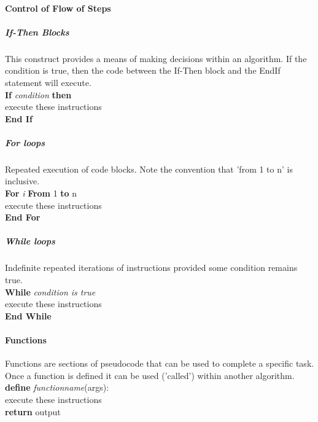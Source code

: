 \documentclass[a4paper,twoside,10pt]{article}
\newcommand{\codeindent}{\indent\hspace{2em}}
\begin{document}
			\paragraph{Control of Flow of Steps}
				\subparagraph{If-Then Blocks} This construct provides a means of making decisions within an algorithm. If the condition is true, then the code between the If-Then block and the EndIf statement will execute.\\
				\textbf{If} \textit{condition} \textbf{then}\\
				\codeindent execute these instructions\\
				\textbf{End If}
				
				\subparagraph{For loops} Repeated execution of code blocks. Note the convention that 'from 1 to n' is inclusive.\\
				\textbf{For} \textit{i} \textbf{From} 1 \textbf{to} n\\
				\codeindent execute these instructions\\
				\textbf{End For}
				
				\subparagraph{While loops} Indefinite repeated iterations of instructions provided some condition remains true.\\
				\textbf{While} \textit{condition is true}\\
				\codeindent execute these instructions\\
				\textbf{End While}
				
			\paragraph{Functions} Functions are sections of pseudocode that can be used to complete a specific task. Once a function is defined it can be used ('called') within another algorithm.\\
			\textbf{define} \textit{function\textunderscore name}(args):\\
			\codeindent execute these instructions\\
			\textbf{return} output
\end{document}
